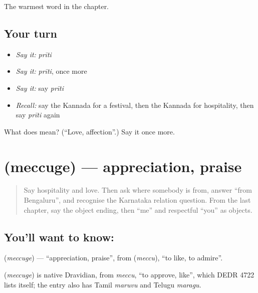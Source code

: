 \begin{grammarlens}[title={What you've built}]
The warmest word in the chapter.
\end{grammarlens}

\subsection*{Your turn}
\begin{itemize}
\raggedright
  \item \emph{Say it:} \emph{prīti}
  \item \emph{Say it:} \emph{prīti}, once more
  \item \emph{Say it:} say \emph{prīti}
  \item \emph{Recall:} say the Kannada for a festival, then the Kannada for hospitality, then say \emph{prīti} again
\end{itemize}

\begin{tcolorbox}[breakable,colback=teal!4,colframe=teal!35!black,title={Before you move on}]
What does  mean? (\textquotedblleft{}Love, affection\textquotedblright{}.) Say it once more.
\end{tcolorbox}
\section[\texorpdfstring{\kn{ಮೆಚ್ಚುಗೆ} (meccuge)}{ಮೆಚ್ಚುಗೆ (meccuge)}]{ (meccuge) — appreciation, praise}

\label{lesson:KA-C105-appreciation}



\begin{quote}
Say hospitality and love. Then ask where somebody is from, answer “from Bengaluru”, and recognise the Karnataka relation question. From the last chapter, say the object ending, then “me” and respectful “you” as objects.
\end{quote}

\subsection*{You'll want to know: }
\textbf{} (\emph{meccuge}) — \textquotedblleft{}appreciation, praise\textquotedblright{}, from \textbf{} (\emph{meccu}), \textquotedblleft{}to like, to admire\textquotedblright{}.

\begin{cousinweb}
\textbf{} (\emph{meccuge}) is native Dravidian, from \emph{meccu}, \textquotedblleft{}to approve, like\textquotedblright{}, which DEDR 4722 lists itself; the entry also has Tamil \emph{maruvu} and Telugu \emph{maragu}.
\end{cousinweb}

